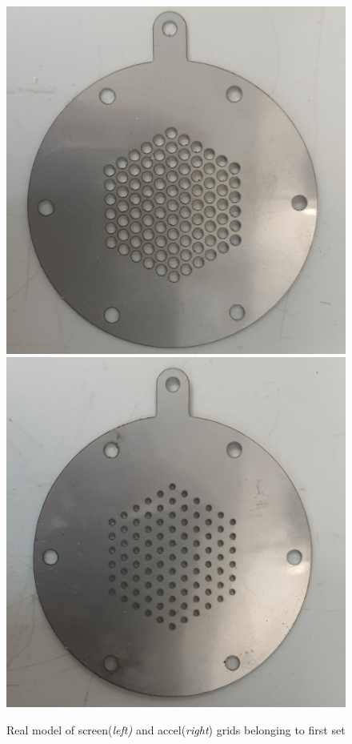 \begin{figure}[ht]
    \centering
    \includegraphics[scale=.08]{fig/screen_6_real.jpg}
    \includegraphics[scale=.08]{fig/accel_6_real.jpg}
    \caption{Real model of screen(\textit{left)} and accel(\textit{right}) grids belonging to first set}
    \label{fig:real_firstset}
\end{figure}

